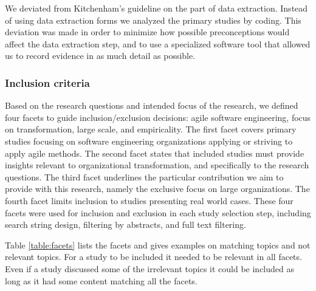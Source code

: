 \documentclass[preprint,authoryear,12pt]{elsarticle}
\begin{document}
We deviated from Kitchenham's guideline on the part of data extraction. Instead
of using data extraction forms we analyzed the primary studies by coding. This
deviation was made in order to minimize how possible preconceptions would affect
the data extraction step, and to use a specialized software tool that allowed us
to record evidence in as much detail as possible.

\subsubsection{Inclusion criteria}
\label{sec:inclusioncriteria}

Based on the research questions and intended focus of the research, we defined
four facets to guide inclusion/exclusion decisions: agile software engineering,
focus on transformation, large scale, and empiricality. The first facet covers
primary studies focusing on software engineering organizations applying or
striving to apply agile methods. The second facet states that included studies
must provide insights relevant to organizational transformation, and
specifically to the research questions. The third facet underlines the
particular contribution we aim to provide with this research, namely the
exclusive focus on large organizations. The fourth facet limits inclusion to
studies presenting real world cases. These four facets were used for inclusion
and exclusion in each study selection step, including search string design,
filtering by abstracts, and full text filtering.

Table \ref{table:facets} lists the facets and gives examples on matching topics
and not relevant topics. For a study to be included it needed to be relevant
in all facets. Even if a study discussed some of the irrelevant topics it could
be included as long as it had some content matching all the facets.
\end{document}
